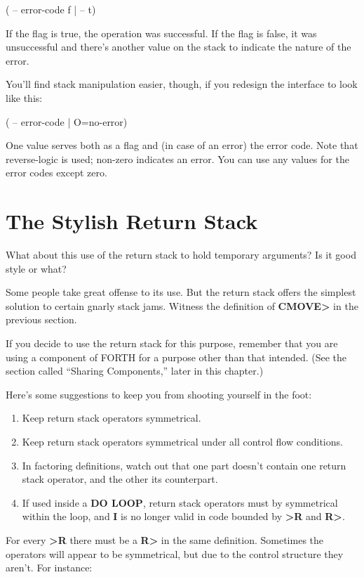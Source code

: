 \begin{Code}
( -- error-code f | -- t)
\end{Code}
If the flag is true, the operation was successful. If the flag is false, it was
unsuccessful and there's another value on the stack to indicate the nature
of the error.

You'll find stack manipulation easier, though, if you redesign the interface
to look like this:

\begin{Code}
( -- error-code | O=no-error)
\end{Code}
One value serves both as a flag and (in case of an error) the error code.
Note that reverse-logic is used; non-zero indicates an error. You can use
any values for the error codes except zero.

\section{The Stylish Return Stack}

What about this use of the return stack to hold temporary arguments? Is
it good style or what?

Some people take great offense to its use. But the return stack
offers the simplest solution to certain gnarly stack jams. Witness the
definition of \textbf{CMOVE>} in the previous section.

If you decide to use the return stack for this purpose, remember
that you are using a component of FORTH for a purpose other than that
intended. (See the section called ``Sharing Components,'' later in this
chapter.)

Here's some suggestions to keep you from shooting yourself in the
foot:

\begin{tip}
\begin{enumerate}
\item Keep return stack operators symmetrical.
\item Keep return stack operators symmetrical under all control flow
   conditions.
\item In factoring definitions, watch out that one part doesn't contain one
   return stack operator, and the other its counterpart.
\item If used inside a \textbf{DO LOOP}, return stack operators must by symmetrical
   within the loop, and \textbf{I} is no longer valid in code bounded by
   \textbf{>R} and \textbf{R>}.
\end{enumerate}
\end{tip}
For every \textbf{>R} there must be a \textbf{R>} in the same definition. Sometimes
the operators will appear to be symmetrical, but due to the control structure
they aren't. For instance:

